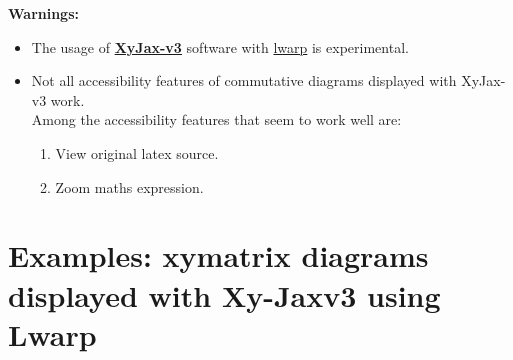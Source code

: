 \documentclass[a4paper,12pt]{article}
\newtheorem{Fundamental Theorem}{Fundamental Theorem}
\begin{document}
\textbf{Warnings:}
\begin{itemize}
  \item  The usage of  \href{https://github.com/sonoisa/XyJax-v3}{\textbf{XyJax-v3}} software with \href{https://ctan.org/pkg/lwarp}{lwarp} is experimental.
  \item Not all accessibility features of commutative diagrams displayed with XyJax-v3 work.\\ Among the accessibility features that seem to work well are:
 \begin{enumerate}
  \item View original latex source.
  \item Zoom maths expression.
 \end{enumerate}
 \end{itemize}






\section{Examples: xymatrix diagrams displayed with Xy-Jaxv3 using Lwarp}\label{sec:context}
\end{document}
